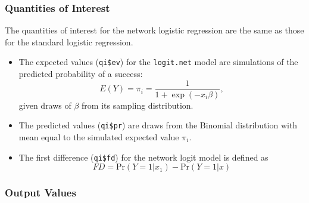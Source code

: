 \subsubsection{Quantities of Interest}
The quantities of interest for the network logistic regression are the same as those for the standard logistic regression. 
\begin{itemize}
\item The expected values ({\tt qi\$ev}) for the {\tt logit.net} model are simulations of the predicted probability of a success:  
\begin{equation*}
E(Y) = \pi_{i} = \frac{1}{1 + \exp(-x_{i}\beta)},
\end{equation*}
given draws of $\beta$ from its sampling distribution.

\item The predicted values ({\tt qi\$pr}) are draws from the Binomial distribution with mean equal to the simulated expected value $\pi_{i}$.

\item The first difference ({\tt qi\$fd}) for the network logit model is defined as 
\begin{equation*}
FD = \text{Pr}(Y = 1 | x_{1}) - \text{Pr}(Y = 1| x)
\end{equation*}
\end{itemize}


\subsubsection{Output Values}

